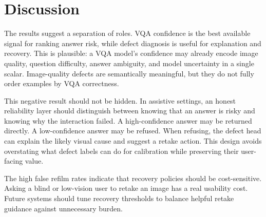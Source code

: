 \section{Discussion}

The results suggest a separation of roles. VQA confidence is the best available signal for ranking answer risk, while defect diagnosis is useful for explanation and recovery. This is plausible: a VQA model's confidence may already encode image quality, question difficulty, answer ambiguity, and model uncertainty in a single scalar. Image-quality defects are semantically meaningful, but they do not fully order examples by VQA correctness.

This negative result should not be hidden. In assistive settings, an honest reliability layer should distinguish between knowing that an answer is risky and knowing why the interaction failed. A high-confidence answer may be returned directly. A low-confidence answer may be refused. When refusing, the defect head can explain the likely visual cause and suggest a retake action. This design avoids overstating what defect labels can do for calibration while preserving their user-facing value.

The high false refilm rates indicate that recovery policies should be cost-sensitive. Asking a blind or low-vision user to retake an image has a real usability cost. Future systems should tune recovery thresholds to balance helpful retake guidance against unnecessary burden.
